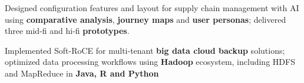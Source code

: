       \vspace{-1.0mm}
      \resumeItemListStart
      \item Designed configuration features and layout for supply chain management with AI using \textbf{comparative analysis}, \textbf{journey maps} and \textbf{user personas}; delivered three mid-fi and hi-fi \textbf{prototypes}.
    \resumeItemListEnd
    \vspace{-3mm}

      \vspace{-1.0mm}
      \resumeItemListStart
      \item Implemented Soft-RoCE for multi-tenant \textbf{big data cloud backup} solutions; optimized data processing workflows using \textbf{Hadoop} ecosystem, including HDFS and MapReduce in \textbf{Java, R and Python}

      
    \resumeItemListEnd
  \resumeSubHeadingListEnd
\vspace{-8mm}

